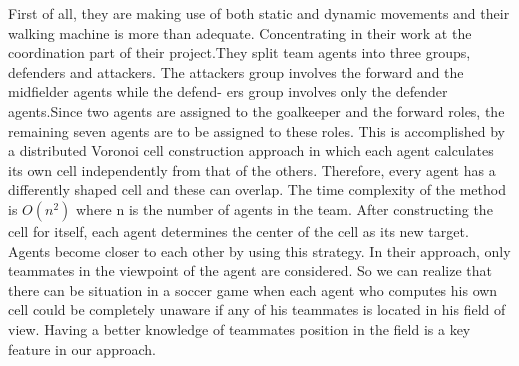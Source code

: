 First of all, they are making use of both static and dynamic movements and their walking machine is more than adequate. Concentrating in their work at the coordination part of their project.They split team agents into three groups, defenders and attackers. The attackers group involves the forward and the midfielder agents while the defend-
ers group involves only the defender agents.Since two agents are assigned to the
goalkeeper and the forward roles, the remaining seven agents are to be assigned
to these roles. This
is accomplished by a distributed Voronoi cell construction approach in which
each agent calculates its own cell independently from that of the others. Therefore, every agent has a differently shaped cell and these can overlap. The time complexity of the method is $O(n^{2})$ where n is the number of agents in the team. After constructing the cell
for itself, each agent determines the center of the cell as its new target. Agents
become closer to each other by using this strategy. In their approach, only teammates in the viewpoint of the agent are considered. So we can realize that there can be situation in a soccer game when each agent who computes his own cell could be completely unaware if any of his teammates is located in his field of view. Having a better knowledge of teammates position in the field is a key feature in our approach.








